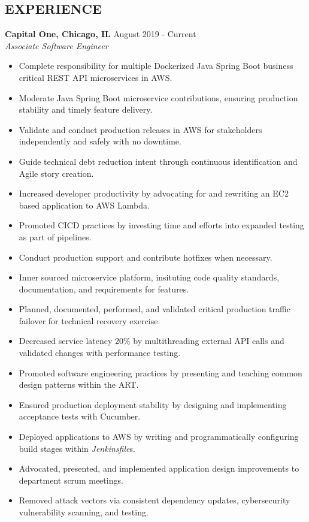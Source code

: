 \documentclass[overlapped]{res}
\begin{document}
\begin{resume}
\section{EXPERIENCE}
\textbf{Capital One, Chicago, IL} \hfill August 2019 - Current \\
{\sl Associate Software Engineer}
\begin{itemize}  \itemsep -2pt %
    \item Complete responsibility for multiple Dockerized Java Spring Boot business critical REST API microservices in AWS.
    \item Moderate Java Spring Boot microservice contributions, ensuring production stability and timely feature delivery. %
    \item Validate and conduct production releases in AWS for stakeholders independently and safely with no downtime.
    \item Guide technical debt reduction intent through continuous identification and Agile story creation.
    \item Increased developer productivity by advocating for and rewriting an EC2 based application to AWS Lambda.
    \item Promoted CICD practices by investing time and efforts into expanded testing as part of pipelines.
    \item Conduct production support and contribute hotfixes when necessary.
    \item Inner sourced microservice platform, insituting code quality standards, documentation, and requirements for features.
    \item Planned, documented, performed, and validated critical production traffic failover for technical recovery exercise. 
    \item Decreased service latency 20\% by multithreading external
    API calls and validated changes with performance testing.
    \item Promoted software engineering practices by presenting and teaching common design patterns within the ART. 
    \item Ensured production deployment stability by designing 
    and implementing acceptance tests with Cucumber.
    \item Deployed applications to AWS by
    writing and programmatically configuring build stages within {\it Jenkinsfile}s.
    \item Advocated, presented, and implemented application design improvements to department scrum meetings.
    \item Removed attack vectors via consistent dependency updates, cybersecurity vulnerability scanning, and testing.
\end{itemize}


\end{resume}
\end{document}

